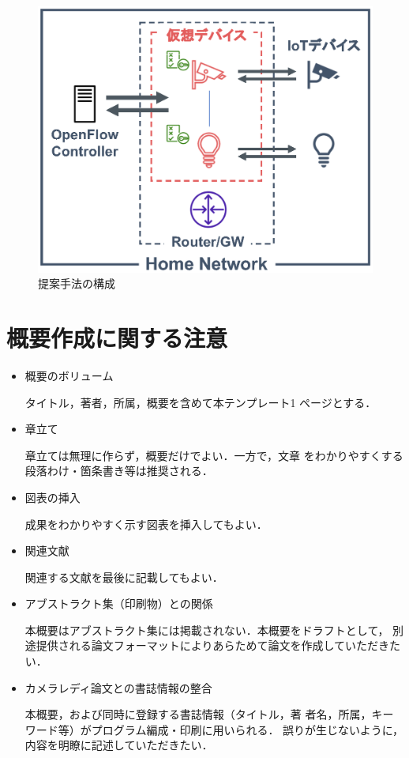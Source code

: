 \documentclass[Japanese]{dicomopapers}
\begin{document}
\begin{figure}[!tb]
  \centering
  \includegraphics[width=\linewidth]{img/system.eps}
  \caption{提案手法の構成}
  \label{fig:syste}
\end{figure}

\section{概要作成に関する注意}
\begin{itemize}
  \item 概要のボリューム

        タイトル，著者，所属，概要を含めて本テンプレート1
        ページとする．

  \item 章立て

        章立ては無理に作らず，概要だけでよい．一方で，文章
        をわかりやすくする段落わけ・箇条書き等は推奨される．

  \item 図表の挿入

        成果をわかりやすく示す図表を挿入してもよい．

  \item 関連文献

        関連する文献を最後に記載してもよい．

  \item アブストラクト集（印刷物）との関係

        本概要はアブストラクト集には掲載されない．本概要をドラフトとして，
        別途提供される論文フォーマットによりあらためて論文を作成していただきたい．

  \item カメラレディ論文との書誌情報の整合

        本概要，および同時に登録する書誌情報（タイトル，著
        者名，所属，キーワード等）がプログラム編成・印刷に用いられる．
        誤りが生じないように，内容を明瞭に記述していただきたい．

\end{itemize}
\end{document}
